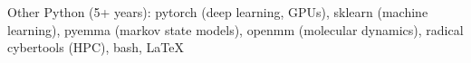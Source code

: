 
\begin{rubric}{Other}
\noentry{}
	Python (5+ years): pytorch (deep learning, GPUs), sklearn (machine learning), pyemma (markov state models), openmm (molecular dynamics), radical cybertools (HPC), bash, \LaTeX
\end{rubric}

